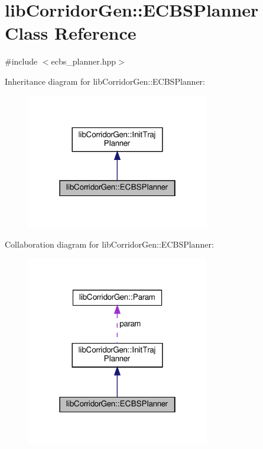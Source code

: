 \hypertarget{classlib_corridor_gen_1_1_e_c_b_s_planner}{}\section{lib\+Corridor\+Gen\+:\+:E\+C\+B\+S\+Planner Class Reference}
\label{classlib_corridor_gen_1_1_e_c_b_s_planner}


{\ttfamily \#include $<$ecbs\+\_\+planner.\+hpp$>$}



Inheritance diagram for lib\+Corridor\+Gen\+:\+:E\+C\+B\+S\+Planner\+:
\nopagebreak
\begin{figure}[H]
\begin{center}
\leavevmode
\includegraphics[width=226pt]{classlib_corridor_gen_1_1_e_c_b_s_planner__inherit__graph}
\end{center}
\end{figure}


Collaboration diagram for lib\+Corridor\+Gen\+:\+:E\+C\+B\+S\+Planner\+:
\nopagebreak
\begin{figure}[H]
\begin{center}
\leavevmode
\includegraphics[width=226pt]{classlib_corridor_gen_1_1_e_c_b_s_planner__coll__graph}
\end{center}
\end{figure}
